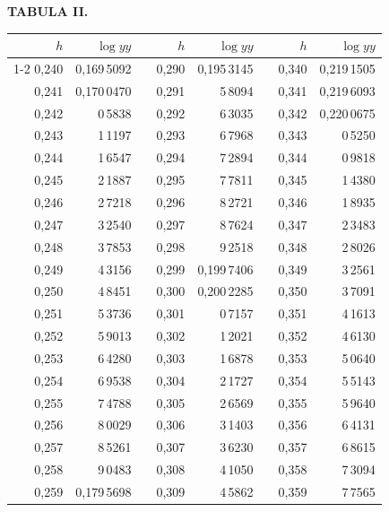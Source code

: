 \endgroup
\clearpage
{}
\begingroup
\centering
\fontsize{9}{9}\selectfont
\setlength{\tabcolsep}{8pt}
\renewcommand{\arraystretch}{1}
\setlength{\parskip}{0pt}
\textbf{TABULA II.}
\par\vspace{7pt}
\begin{tabular}{|r|r|@{}p{9pt}@{}|r|r|@{}p{9pt}@{}|r|r|}
\hline
\(h\) & \(\log yy\) & & \(h\) & \(\log yy\) & & \(h\) & \(\log yy\) \\
\cline{1-2}\cline{4-5}\cline{7-8}
0,240 & 0,169\,5092 &  & 0,290 & 0,195\,3145 &  & 0,340 & 0,219\,1505 \\
0,241 & 0,170\,0470 &  & 0,291 & 5\,8094 &  & 0,341 & 0,219\,6093 \\
0,242 & 0\,5838 &  & 0,292 & 6\,3035 &  & 0,342 & 0,220\,0675 \\
0,243 & 1\,1197 &  & 0,293 & 6\,7968 &  & 0,343 & 0\,5250 \\
0,244 & 1\,6547 &  & 0,294 & 7\,2894 &  & 0,344 & 0\,9818 \\
0,245 & 2\,1887 &  & 0,295 & 7\,7811 &  & 0,345 & 1\,4380 \\[3pt]
0,246 & 2\,7218 &  & 0,296 & 8\,2721 &  & 0,346 & 1\,8935 \\
0,247 & 3\,2540 &  & 0,297 & 8\,7624 &  & 0,347 & 2\,3483 \\
0,248 & 3\,7853 &  & 0,298 & 9\,2518 &  & 0,348 & 2\,8026 \\
0,249 & 4\,3156 &  & 0,299 & 0,199\,7406 &  & 0,349 & 3\,2561 \\
0,250 & 4\,8451 &  & 0,300 & 0,200\,2285 &  & 0,350 & 3\,7091 \\[3pt]
0,251 & 5\,3736 &  & 0,301 & 0\,7157 &  & 0,351 & 4\,1613 \\
0,252 & 5\,9013 &  & 0,302 & 1\,2021 &  & 0,352 & 4\,6130 \\
0,253 & 6\,4280 &  & 0,303 & 1\,6878 &  & 0,353 & 5\,0640 \\
0,254 & 6\,9538 &  & 0,304 & 2\,1727 &  & 0,354 & 5\,5143 \\
0,255 & 7\,4788 &  & 0,305 & 2\,6569 &  & 0,355 & 5\,9640 \\[3pt]
0,256 & 8\,0029 &  & 0,306 & 3\,1403 &  & 0,356 & 6\,4131 \\
0,257 & 8\,5261 &  & 0,307 & 3\,6230 &  & 0,357 & 6\,8615 \\
0,258 & 9\,0483 &  & 0,308 & 4\,1050 &  & 0,358 & 7\,3094 \\
0,259 & 0,179\,5698 &  & 0,309 & 4\,5862 &  & 0,359 & 7\,7565 \\

\end{tabular}
